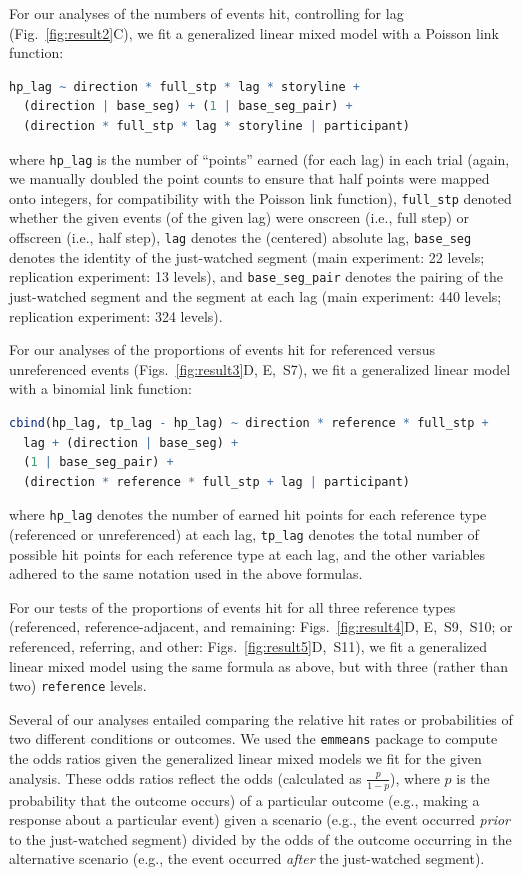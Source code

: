 \documentclass[10pt]{article}
\newcommand{\characterRefs}{S7}
\newcommand{\refAdjacent}{S9}
\newcommand{\refAdjacentCorrected}{S10}
\newcommand{\referringReferenced}{S11}
\begin{document}
For our analyses of the numbers of events hit, controlling for lag (Fig.~\ref{fig:result2}C), we fit a generalized linear mixed model with a Poisson link function:
\begin{lstlisting}[language=R]
  hp_lag ~ direction * full_stp * lag * storyline +
  (direction | base_seg) + (1 | base_seg_pair) +
  (direction * full_stp * lag * storyline | participant)
  \end{lstlisting}
where \texttt{hp\_lag} is the number of ``points'' earned (for each lag) in each trial (again, we manually doubled the point counts to ensure that half points were mapped onto integers, for compatibility with the Poisson link function), \texttt{full\_stp} denoted whether the given events (of the given lag) were onscreen (i.e., full step) or offscreen (i.e., half step), \texttt{lag} denotes the (centered) absolute lag, \texttt{base\_seg} denotes the identity of the just-watched segment (main experiment: 22 levels; replication experiment: 13 levels), and \texttt{base\_seg\_pair} denotes the pairing of the just-watched segment and the segment at each lag (main experiment: 440 levels; replication experiment: 324 levels).

For our analyses of the proportions of events hit for referenced versus unreferenced events (Figs.~\ref{fig:result3}D, E,~\characterRefs), we fit a generalized linear model with a binomial link function:
\begin{lstlisting}[language=R]
  cbind(hp_lag, tp_lag - hp_lag) ~ direction * reference * full_stp +
  lag + (direction | base_seg) +
  (1 | base_seg_pair) +
  (direction * reference * full_stp + lag | participant)
\end{lstlisting}
where \texttt{hp\_lag} denotes the number of earned hit points for each reference type (referenced or unreferenced) at each lag, \texttt{tp\_lag} denotes the total number of possible hit points for each reference type at each lag, and the other variables adhered to the same notation used in the above formulas.

For our tests of the proportions of events hit for all three reference types (referenced, reference-adjacent, and remaining: Figs.~\ref{fig:result4}D, E,~\refAdjacent,~\refAdjacentCorrected; or referenced, referring, and other: Figs.~\ref{fig:result5}D,~\referringReferenced), we fit a generalized linear mixed model using the same formula as above, but with three (rather than two) \texttt{reference} levels.

Several of our analyses entailed comparing the relative hit rates or probabilities of two different conditions or outcomes. We used the \texttt{emmeans} package to compute the odds ratios given the generalized linear mixed models we fit for the given analysis. These odds ratios reflect the odds (calculated as $\frac{p}{1-p}$), where $p$ is the probability that the outcome occurs) of a particular outcome (e.g., making a response about a particular event) given a scenario (e.g., the event occurred \textit{prior} to the just-watched segment) divided by the odds of the outcome occurring in the alternative scenario (e.g., the event occurred \textit{after} the just-watched segment).
\end{document}
